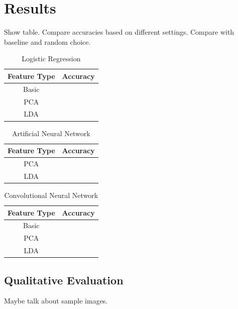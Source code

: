 \documentclass{article} %
\begin{document}
\section{Results}

Show table. Compare accuracies based on different settings. Compare with baseline and random choice.
\begin{table}[H]
\centering
\caption{Logistic Regression}
\label{my-label}
\begin{tabular}{|c|c|}
\hline
\textbf{Feature Type} & \textbf{Accuracy} \\ \hline
Basic                 &                   \\ \hline
PCA                   &                   \\ \hline
LDA                   &                   \\ \hline
\end{tabular}
\end{table}

\begin{table}[H]
\centering
\caption{Artificial Neural Network}
\label{my-label}
\begin{tabular}{|c|c|}
\hline
\textbf{Feature Type} & \textbf{Accuracy} \\ \hline
PCA                   &                   \\ \hline
LDA                   &                   \\ \hline
\end{tabular}
\end{table}

\begin{table}[H]
\centering
\caption{Convolutional Neural Network}
\label{my-label}
\begin{tabular}{|c|c|}
\hline
\textbf{Feature Type} & \textbf{Accuracy} \\ \hline
Basic                 &                   \\ \hline
PCA                   &                   \\ \hline
LDA                   &                   \\ \hline
\end{tabular}
\end{table}

\subsection{Qualitative Evaluation}

Maybe talk about sample images.
\end{document}
